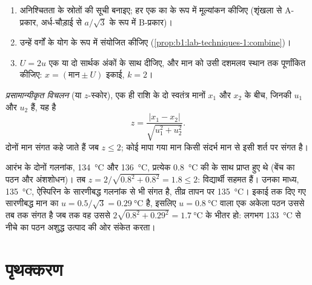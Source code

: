 \begin{method}[परिणाम प्रस्तुत करना]\label{met:b1:lab-techniques-1:report-result}
\begin{enumerate}
  \item अनिश्चितता के स्रोतों की सूची बनाइए; हर एक का  के रूप में मूल्यांकन कीजिए (शृंखला से A-प्रकार, अर्ध-चौड़ाई से
        $a/\sqrt3$ के रूप में B-प्रकार)।
  \item उन्हें वर्गों के योग के रूप में संयोजित कीजिए (\cref{prop:b1:lab-techniques-1:combine})।
  \item {} $U = 2u$ एक या दो
        सार्थक अंकों के साथ दीजिए, और मान को उसी दशमलव स्थान तक
        पूर्णांकित कीजिए: $x = (\text{मान} \pm U)$ इकाई, $k = 2$।
\end{enumerate}
\end{method}

\begin{definition}[प्रसामान्यीकृत विचलन]\label{def:b1:lab-techniques-1:z-score}
\emph{प्रसामान्यीकृत विचलन} (या $z$-स्कोर), एक ही राशि के
दो स्वतंत्र मानों $x_1$ और $x_2$ के बीच, जिनकी
 $u_1$ और $u_2$ हैं, यह है
\[
  z = \frac{|x_1 - x_2|}{\sqrt{u_1^2 + u_2^2}} .
\]
दोनों मान संगत कहे जाते हैं जब $z \le 2$; कोई मापा गया मान
किसी संदर्भ मान से इसी शर्त पर संगत है।
\end{definition}

\begin{example}[दो विद्यार्थी]
आरंभ के दोनों गलनांक, \qty{134}{\celsius} और
\qty{136}{\celsius}, प्रत्येक \qty{0.8}{\celsius} की  के साथ
प्राप्त हुए थे (बेंच का पठन और अंशशोधन)। तब
$z = 2/\sqrt{0.8^2 + 0.8^2} = 1.8 \le 2$: विद्यार्थी सहमत हैं। उनका माध्य,
\qty{135}{\celsius}, ऐस्पिरिन के सारणीबद्ध गलनांक से भी संगत है,
तीव्र तापन पर \qty{135}{\celsius}। इकाई तक दिए गए सारणीबद्ध मान का
$u = 0.5/\sqrt3 = \qty{0.29}{\celsius}$ है, इसलिए $u = \qty{0.8}{\celsius}$ वाला एक अकेला
पठन उससे तब तक संगत है जब तक वह उससे
$2\sqrt{0.8^2 + 0.29^2} = \qty{1.7}{\celsius}$ के भीतर हो: लगभग \qty{133}{\celsius}
से नीचे का पठन अशुद्ध उत्पाद की ओर संकेत करता।
\end{example}

\section{पृथक्करण}

